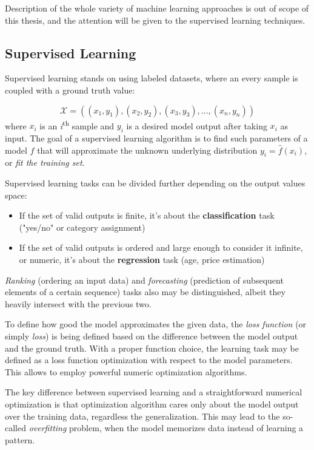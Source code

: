 \documentclass[thesis=B,english]{FITthesis}[2019/12/23]
\begin{document}
	Description of the whole variety of machine learning approaches is out of scope of this thesis, and the attention will be given to the supervised learning techniques.
	
	\subsection{Supervised Learning}
	
	Supervised learning stands on using labeled datasets, where an every sample is coupled with a ground truth value:
	
	\[ \mathcal{X} = ((x_1, y_1), (x_2, y_2), (x_3, y_3), \dots,(x_n, y_n)) \]
	where $x_i$ is an \textit{i}\textsuperscript{th} sample and $y_i$ is a desired model output after taking $x_i$ as input. The goal of a supervised learning algorithm is to find such parameters of a model $f$  that will approximate the unknown underlying distribution $y_i = \hat{f}(x_i)$\cite{theoretical_ml}, or \textit{fit the training set}.
	
	Supervised learning tasks can be divided further depending on the output values space:
	\begin{itemize}
		\item If the set of valid outputs is finite, it's about the \textbf{classification} task ("yes/no" or category assignment)
		\item If the set of valid outputs is ordered and large enough to consider it infinite, or numeric, it's about the \textbf{regression} task (age, price estimation)
	\end{itemize}
	\textit{Ranking} (ordering an input data) and \textit{forecasting} (prediction of subsequent elements of a certain sequence) tasks also may be distinguished, albeit they heavily intersect with the previous two.
	
	To define how good the model approximates the given data, the \textit{loss function} (or simply \textit{loss}) is being defined based on the difference between the model output and the ground truth. With a proper function choice, the learning task may be defined as a loss function optimization with respect to the model parameters. This allows to employ powerful numeric optimization algorithms.
	
	The key difference between supervised learning and a straightforward numerical optimization is that optimization algorithm cares only about the model output over the training data, regardless the generalization. This may lead to the so-called \textit{overfitting} problem, when the model memorizes data instead of learning a pattern.
	
\end{document}
